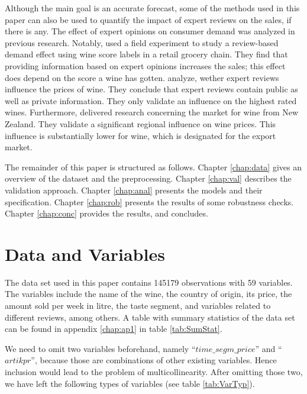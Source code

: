 \documentclass[11pt,]{article}
\begin{document}
Although the main goal is an accurate forecast, some of the methods used
in this paper can also be used to quantify the impact of expert reviews
on the sales, if there is any. The effect of expert opinions on consumer
demand was analyzed in previous research. Notably,
\textcite[][p. 1289]{Hilger2011} used a field experiment to study a
review-based demand effect using wine score labels in a retail grocery
chain. They find that providing information based on expert opinions
increases the sales; this effect does depend on the score a wine has
gotten. \textcite[][p. 293]{Ashenfelter2013} analyze, wether expert
reviews influence the prices of wine. They conclude that expert reviews
contain public as well as private information. They only validate an
influence on the highest rated wines. Furthermore,
\textcite[][p. 182f.]{Bicknell2012} delivered research concerning the
market for wine from New Zealand. They validate a significant regional
influence on wine prices. This influence is substantially lower for
wine, which is designated for the export market.

The remainder of this paper is structured as follows. Chapter
\ref{chap:data} gives an overview of the dataset and the preprocessing.
Chapter \ref{chap:val} describes the validation approach. Chapter
\ref{chap:anal} presents the models and their specification. Chapter
\ref{chap:rob} presents the results of some robustness checks. Chapter
\ref{chap:conc} provides the results, and concludes.

\hypertarget{data-and-variables}{%
\section{\texorpdfstring{Data and Variables
\label{chap:data}}{Data and Variables }}\label{data-and-variables}}

The data set used in this paper contains 145179 observations with 59
variables. The variables include the name of the wine, the country of
origin, its price, the amount sold per week in litre, the taste segment,
and variables related to different reviews, among others. A table with
summary statistics of the data set can be found in appendix
\ref{chap:ap1} in table \ref{tab:SumStat}.

We need to omit two variables beforehand, namely
\enquote{\(time\_segm\_price\)} and \enquote{\(artikpr\)}, because those
are combinations of other existing variables. Hence inclusion would lead
to the problem of multicollinearity. After omitting those two, we have
left the following types of variables (see table \ref{tab:VarTyp}).
\end{document}
